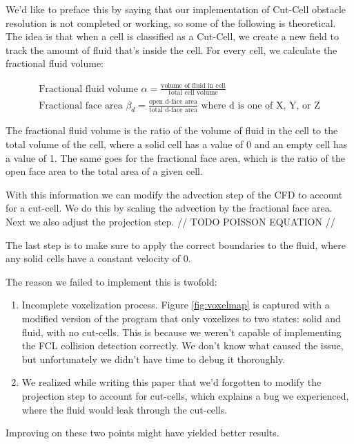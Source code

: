 \documentclass[a4paper,12pt]{article}
\begin{document}
We'd like to preface this by saying that our implementation of Cut-Cell obstacle
resolution is not completed or working, so some of the following is theoretical.
The idea is that when a cell is classified as a Cut-Cell, we create a new field to
track the amount of fluid that's inside the cell. For every cell, we calculate the
fractional fluid volume:

\[
	\begin{array}{ll}
		\text{Fractional fluid volume } \alpha = \frac{\text{volume of fluid in cell}}{\text{total cell volume}} \\
		\text{Fractional face area } \beta_d = \frac{\text{open d-face area}}{\text{total d-face area}} \text{ where d is one of X, Y, or Z}
	\end{array}
\]

The fractional fluid volume is the ratio of the volume of fluid in the cell to the
total volume of the cell, where a solid cell has a value of 0 and an empty cell has
a value of 1. The same goes for the fractional face area, which is the ratio of the
open face area to the total area of a given cell.

With this information we can modify the advection step of the CFD to account for
a cut-cell. We do this by scaling the advection by the fractional face area. Next
we also adjust the projection step. // TODO POISSON EQUATION //

The last step is to make sure to apply the correct boundaries to the fluid,
where any solid cells have a constant velocity of 0.

The reason we failed to implement this is twofold:
\begin{enumerate}
	\item{
			Incomplete voxelization process. Figure \ref{fig:voxelmap} is
			captured with a modified version of the program that only voxelizes
			to two states: solid and fluid, with no cut-cells. This is because we
			weren't capable of implementing the FCL collision detection correctly.
			We don't know what caused the issue, but unfortunately we didn't have
			time to debug it thoroughly.
	}
	\item{
			We realized while writing this paper that we'd forgotten to modify the
			projection step to account for cut-cells, which explains a bug we experienced,
			where the fluid would leak through the cut-cells.
		}
\end{enumerate}

Improving on these two points might have yielded better results.
\end{document}

